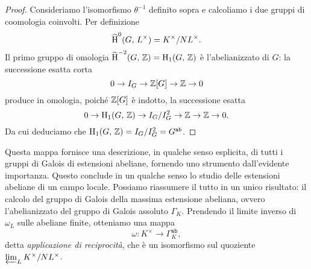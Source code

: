 \begin{proof}
	Consideriamo l'isomorfismo $ \theta^{-1} $ definito sopra e calcoliamo i due gruppi di coomologia coinvolti. Per definizione
	\[ \operatorname{\widehat{H}}^{0}(G, \,  L^\times) = K^\times / NL^\times. \]
	Il primo gruppo di omologia $ \operatorname{\widehat{H}}^{-2}(G, \, \mathbb{Z}) = \operatorname{H}_1(G, \, \mathbb{Z}) $ è l'abelianizzato di $ G $: la successione esatta corta
	\[ 0 \to I_G \to \mathbb{Z}[G] \to \mathbb{Z} \to 0 \]
	produce in omologia, poiché $ \mathbb{Z}[G] $ è indotto, la successione esatta
	\[ 0 \to \operatorname{H}_1(G,\, \mathbb{Z}) \to I_G/I_G^2 \to \mathbb{Z} \to \mathbb{Z} \to 0. \]
	Da cui deduciamo che $ \operatorname{H}_1(G,\, \mathbb{Z}) = I_G/I_G^2 = G^\mathtt{ab} $.
\end{proof}


Questa mappa fornisce una descrizione, in qualche senso esplicita, di tutti i gruppi di Galois di estensioni abeliane, fornendo uno strumento dall'evidente importanza. Questo conclude in un qualche senso lo studio delle estensioni abeliane di un campo locale. Possiamo riassumere il tutto in un unico risultato: il calcolo del gruppo di Galois della massima estensione abeliana, ovvero l'abelianizzato del gruppo di Galois assoluto $ \Gamma_K $. Prendendo il limite inverso di $ \omega_L $ sulle abeliane finite, otteniamo una mappa
\[ \omega\colon K^\times \to \Gamma_K^{\texttt{ab}}, \]
detta \emph{applicazione di reciprocità}, che è un isomorfismo sul quoziente $ \varprojlim_L K^\times / NL^\times  $.

